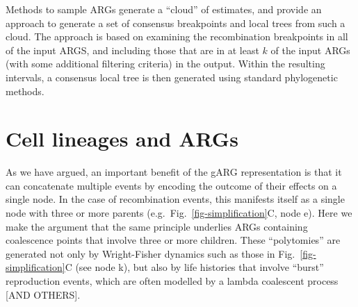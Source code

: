 \documentclass{article}
\newcommand{\noderef}[1]{\textsf{#1}}
\begin{document}
Methods to sample ARGs generate a ``cloud'' of estimates, and
\cite{kuhner2017consensus} provide an approach to generate a
set of consensus breakpoints and local trees from
such a cloud.
The approach is based on examining the recombination breakpoints
in all of the input ARGS, and including those that are
in at least $k$ of the input ARGs (with some additional
filtering criteria) in the output.
Within the resulting intervals, a consensus
local tree is then generated using standard phylogenetic methods.



\section{Cell lineages and ARGs}
\label{sec-cell-lineages-and-args}
As we have argued, an important benefit of the gARG representation is that it
can concatenate multiple events by encoding the outcome of their effects
on a single node. In the case of recombination events, this manifests itself as
a single node with three or more parents (e.g.\ Fig.~\ref{fig-simplification}C, node \noderef{e}).
Here we make the argument that the same principle underlies ARGs containing
coalescence points that involve three or more children. These ``polytomies'' are generated not only
by Wright-Fisher dynamics such as those in Fig.~\ref{fig-simplification}C (see node \noderef{k}), but also
by life histories that involve ``burst'' reproduction events, which are often modelled by a lambda
coalescent process [AND OTHERS]\citep{wakely2008coalescent}.
\end{document}

